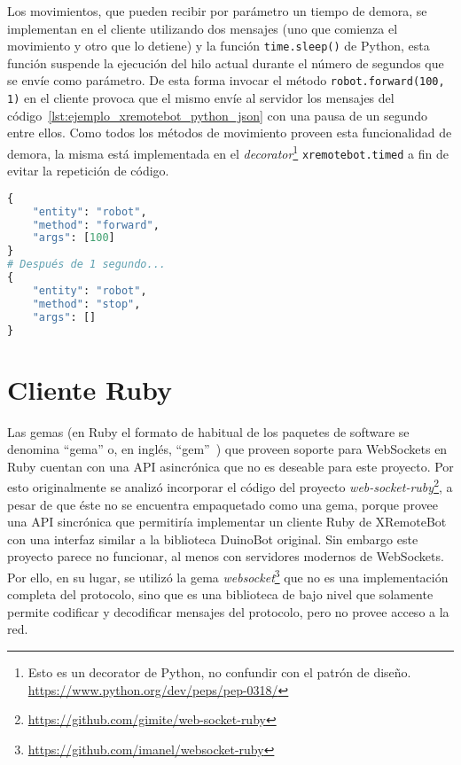 Los movimientos, que pueden recibir por parámetro un tiempo de demora,
se implementan en el cliente
utilizando dos mensajes (uno que comienza el movimiento y otro que lo detiene)
y la función \texttt{time.sleep()} de Python,
esta función suspende la ejecución del hilo actual durante el número
de segundos que se envíe como parámetro. De esta
forma
invocar el método \texttt{robot.forward(100, 1)} en el cliente provoca que
el mismo envíe al servidor los mensajes del
código~\ref{lst:ejemplo_xremotebot_python_json} con una pausa de un segundo
entre ellos. Como todos los métodos de movimiento
proveen esta funcionalidad de demora, la misma está implementada en el
\textit{decorator}\footnote{Esto es un decorator de Python, no confundir
con el patrón de diseño. \url{https://www.python.org/dev/peps/pep-0318/}}
\texttt{xremotebot.timed} a fin de evitar la repetición de código.

\begin{lstlisting}[language=Python,
caption={Mensajes generados al invocar \texttt{robot.forward(100, 1)} en
XRemoteBot para Python}, label=lst:ejemplo_xremotebot_python_json]
{
    "entity": "robot",
    "method": "forward",
    "args": [100]
}
# Después de 1 segundo...
{
    "entity": "robot",
    "method": "stop",
    "args": []
}
\end{lstlisting}


\section{Cliente Ruby}\label{ch4:ruby}

Las gemas (en Ruby el formato de habitual de los paquetes de software
se denomina ``gema'' o, en inglés, ``gem''~\citep{thomas_2013})
que proveen soporte para WebSockets en Ruby cuentan con una API
asincrónica que no es deseable para este proyecto.
Por esto originalmente se analizó incorporar el código del proyecto
\textit{web-socket-ruby}\footnote{\url{https://github.com/gimite/web-socket-ruby}},
a pesar de que éste no se encuentra empaquetado como una gema, porque
provee una API sincrónica que permitiría implementar un cliente Ruby de XRemoteBot
con una interfaz similar a la biblioteca DuinoBot original.
Sin embargo este proyecto parece no
funcionar, al menos con servidores modernos de WebSockets. Por ello, en su lugar,
se utilizó la gema \textit{websocket}\footnote{\url{https://github.com/imanel/websocket-ruby}}
que no es una implementación completa
del protocolo, sino que es una biblioteca de bajo nivel que
solamente permite codificar y decodificar mensajes del protocolo, pero no provee
acceso a la red.

